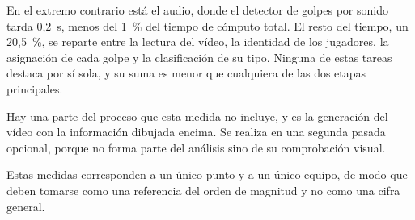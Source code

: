 En el extremo contrario está el audio, donde el detector de golpes por sonido tarda 0,2~s, menos del 1~\% del tiempo de cómputo total.
El resto del tiempo, un 20,5~\%, se reparte entre la lectura del vídeo, la identidad de los jugadores, la asignación de cada golpe y la clasificación de su tipo.
Ninguna de estas tareas destaca por sí sola, y su suma es menor que cualquiera de las dos etapas principales.

Hay una parte del proceso que esta medida no incluye, y es la generación del vídeo con la información dibujada encima.
Se realiza en una segunda pasada opcional, porque no forma parte del análisis sino de su comprobación visual.

Estas medidas corresponden a un único punto y a un único equipo, de modo que deben tomarse como una referencia del orden de magnitud y no como una cifra general.
